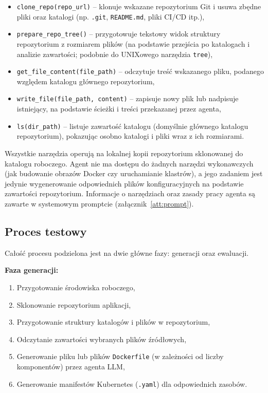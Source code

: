 \begin{itemize}
    \item \texttt{clone\_repo(repo\_url)} – klonuje wskazane repozytorium Git i usuwa zbędne pliki oraz katalogi (np. \texttt{.git}, \texttt{README.md}, pliki CI/CD itp.),
    
    \item \texttt{prepare\_repo\_tree()} – przygotowuje tekstowy widok struktury repozytorium z rozmiarem plików (na podstawie przejścia po katalogach i analizie zawartości; podobnie do UNIXowego narzędzia \texttt{tree}),
    
    \item \texttt{get\_file\_content(file\_path)} – odczytuje treść wskazanego pliku, podanego względem katalogu głównego repozytorium,
    
    \item \texttt{write\_file(file\_path, content)} – zapisuje nowy plik lub nadpisuje istniejący, na podstawie ścieżki i treści przekazanej przez agenta,
    
    \item \texttt{ls(dir\_path)} – listuje zawartość katalogu (domyślnie głównego katalogu repozytorium), pokazując osobno katalogi i pliki wraz z ich rozmiarami.
\end{itemize}

Wszystkie narzędzia operują na lokalnej kopii repozytorium sklonowanej do katalogu roboczego. Agent nie ma dostępu do żadnych narzędzi wykonawczych (jak budowanie obrazów Docker czy uruchamianie klastrów), a jego zadaniem jest jedynie wygenerowanie odpowiednich plików konfiguracyjnych na podstawie zawartości repozytorium. Informacje o narzędziach oraz zasady pracy agenta są zawarte w systemowym promptcie (załącznik~\ref{att:prompt}).

\subsection{Proces testowy}

Całość procesu podzielona jest na dwie główne fazy: generacji oraz ewaluacji.

\noindent
\textbf{Faza generacji:}

\begin{enumerate}
    \item Przygotowanie środowiska roboczego,
    \item Sklonowanie repozytorium aplikacji,
    \item Przygotowanie struktury katalogów i plików w repozytorium,
    \item Odczytanie zawartości wybranych plików źródłowych,
    \item Generowanie pliku lub plików \texttt{Dockerfile} (w zależności od liczby komponentów) przez agenta LLM,
    \item Generowanie manifestów Kubernetes (\texttt{.yaml}) dla odpowiednich zasobów.
\end{enumerate}

